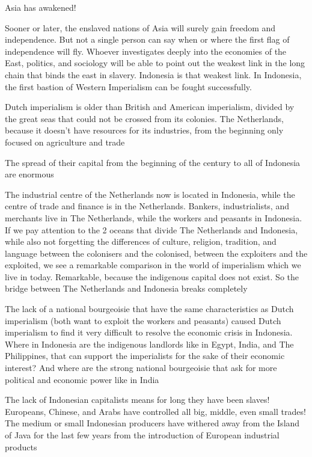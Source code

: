 Asia has awakened! \nline

Sooner or later, the enslaved nations of Asia will surely gain freedom and independence. 
But not a single person can say when or where the first flag of independence will fly. 
Whoever investigates deeply into the economies of the East, politics, and sociology will 
be able to point out the weakest link in the long chain that binds the east in slavery. Indonesia is that weakest link. 
In Indonesia, the first bastion of Western Imperialism can be fought successfully. \nline

Dutch imperialism is older than British and American imperialism, divided by the great seas that could not be crossed from its colonies. 
The Netherlands, because it doesn't have resources for its industries, from the beginning only focused on agriculture and trade\nline

The spread of their capital from the beginning of the century to all of Indonesia are enormous\nline

The industrial centre of the Netherlands now is located in Indonesia, while the centre of trade and finance is in the Netherlands. 
Bankers, industrialists, and merchants live in The Netherlands, while the workers and peasants in Indonesia. 
If we pay attention to the 2 oceans that divide The Netherlands and Indonesia, while also not forgetting the differences of 
culture, religion, tradition, and language between the colonisers and the colonised, between the exploiters and the exploited,
we see a remarkable comparison in the world of imperialism which we live in today. Remarkable, because the indigenous capital 
does not exist. So the bridge between The Netherlands and Indonesia breaks completely\nline

The lack of a national bourgeoisie that have the same characteristics as Dutch imperialism 
(both want to exploit the workers and peasants) caused Dutch imperialism to find it 
very difficult to resolve the economic crisis in Indonesia. Where in Indonesia are the 
indigenous landlords like in Egypt, India, and The Philippines, that can support the imperialists 
for the sake of their economic interest? And where are the strong national bourgeoisie that ask 
for more political and economic power like in India\nline

The lack of Indonesian capitalists means for long they have been slaves! 
Europeans, Chinese, and Arabs have controlled all big, middle, even small trades! The medium 
or small Indonesian producers have withered away from the Island of Java for the last few 
years from the introduction of European industrial products\nline

